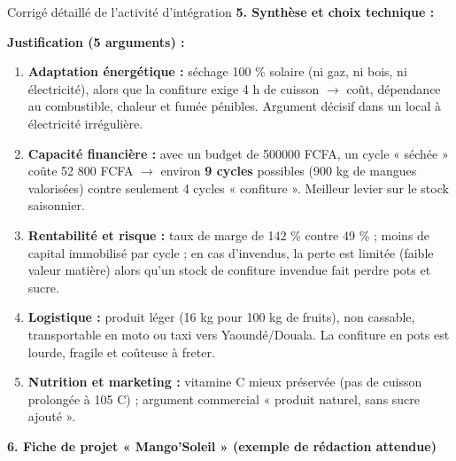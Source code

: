 \documentclass[11pt]{article}
\begin{document}
\begin{exoresolu}{Corrigé détaillé de l'activité d'intégration}
\noindent\textbf{5. Synthèse et choix technique : }

\textbf{Justification (5 arguments) :}
\begin{enumerate}
    \item \textbf{Adaptation énergétique :} séchage 100 \% solaire (ni gaz, ni bois, ni électricité), alors que la confiture exige 4 h de cuisson $\rightarrow$ coût, dépendance au combustible, chaleur et fumée pénibles. Argument décisif dans un local à électricité irrégulière.
    \item \textbf{Capacité financière :} avec un budget de \num{500000} FCFA, un cycle « séchée » coûte 52 800 FCFA $\rightarrow$ environ \textbf{9 cycles} possibles (900 kg de mangues valorisées) contre seulement 4 cycles « confiture ». Meilleur levier sur le stock saisonnier.
    \item \textbf{Rentabilité et risque :} taux de marge de 142 \% contre 49 \% ; moins de capital immobilisé par cycle ; en cas d'invendus, la perte est limitée (faible valeur matière) alors qu'un stock de confiture invendue fait perdre pots et sucre.
    \item \textbf{Logistique :} produit léger (16 kg pour 100 kg de fruits), non cassable, transportable en moto ou taxi vers Yaoundé/Douala. La confiture en pots est lourde, fragile et coûteuse à freter.
    \item \textbf{Nutrition et marketing :} vitamine C mieux préservée (pas de cuisson prolongée à 105 \textdegree C) ; argument commercial « produit naturel, sans sucre ajouté ».
\end{enumerate}

\noindent\textbf{6. Fiche de projet « Mango'Soleil » (exemple de rédaction attendue)}


\end{exoresolu}
\end{document}
